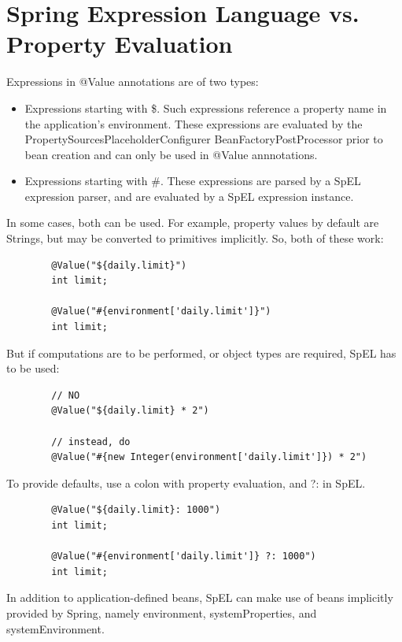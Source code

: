 \documentclass{scrartcl}
\begin{document}
\section{Spring Expression Language vs. Property Evaluation}

    Expressions in @Value annotations are of two types:

    \begin{itemize}
        \item Expressions starting with \$. Such expressions reference a property name in the application’s environment. These expressions are evaluated by the PropertySourcesPlaceholderConfigurer BeanFactoryPostProcessor prior to bean creation and can only be used in @Value annnotations.
        \item Expressions starting with \#.
        These expressions are parsed by a SpEL expression parser, and are evaluated by a SpEL expression instance.
    \end{itemize}

    In some cases, both can be used. For example, property values by default are Strings, but may be converted to primitives implicitly. So, both of these work:

    \begin{lstlisting}
        @Value("${daily.limit}")
        int limit;

        @Value("#{environment['daily.limit']}")
        int limit;
    \end{lstlisting}

    But if computations are to be performed, or object types are required, SpEL has to be used:

    \begin{lstlisting}
        // NO
        @Value("${daily.limit} * 2")

        // instead, do
        @Value("#{new Integer(environment['daily.limit']}) * 2")
    \end{lstlisting}

    To provide defaults, use a colon with property evaluation, and ?: in SpEL.

    \begin{lstlisting}
        @Value("${daily.limit}: 1000")
        int limit;

        @Value("#{environment['daily.limit']} ?: 1000")
        int limit;
    \end{lstlisting}

    In addition to application-defined beans, SpEL can make use of beans implicitly provided by Spring, namely environment, systemProperties, and systemEnvironment.
\end{document}
